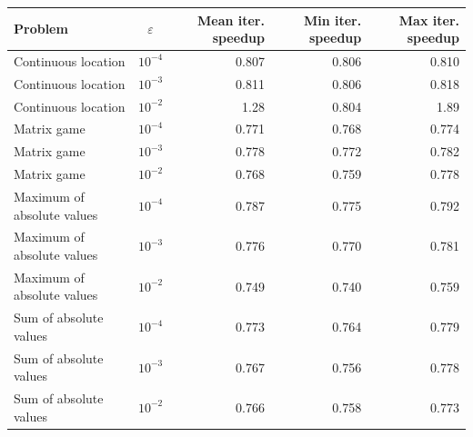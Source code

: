 \begin{tabular}{lcrrr}
\toprule
Problem & $\varepsilon$ & Mean iter. speedup & Min iter. speedup & Max iter. speedup \\
\midrule
Continuous location & $10^{-4}$ & 0.807 & 0.806 & 0.810 \\
Continuous location & $10^{-3}$ & 0.811 & 0.806 & 0.818 \\
Continuous location & $10^{-2}$ & 1.28 & 0.804 & 1.89 \\
Matrix game & $10^{-4}$ & 0.771 & 0.768 & 0.774 \\
Matrix game & $10^{-3}$ & 0.778 & 0.772 & 0.782 \\
Matrix game & $10^{-2}$ & 0.768 & 0.759 & 0.778 \\
Maximum of absolute values & $10^{-4}$ & 0.787 & 0.775 & 0.792 \\
Maximum of absolute values & $10^{-3}$ & 0.776 & 0.770 & 0.781 \\
Maximum of absolute values & $10^{-2}$ & 0.749 & 0.740 & 0.759 \\
Sum of absolute values & $10^{-4}$ & 0.773 & 0.764 & 0.779 \\
Sum of absolute values & $10^{-3}$ & 0.767 & 0.756 & 0.778 \\
Sum of absolute values & $10^{-2}$ & 0.766 & 0.758 & 0.773 \\
\bottomrule
\end{tabular}